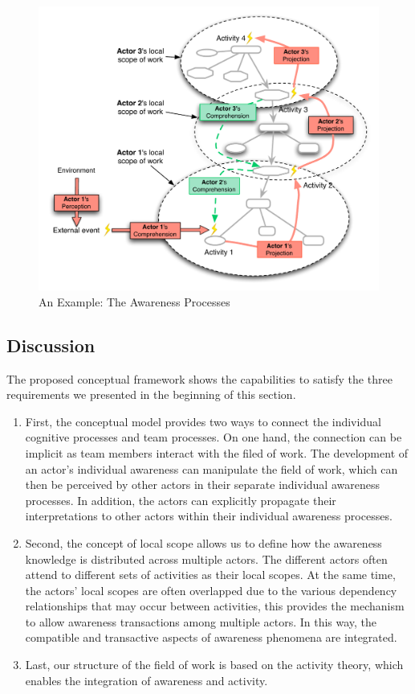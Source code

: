 \begin{figure}[htbp] %
   \centering
   \includegraphics[width=4.5in]{awareness_process.pdf} 
   \caption{An Example: The Awareness Processes}
   \label{fig:awareness_process}
\end{figure}
\subsection{Discussion} %
\label{sub:discussion}
The proposed conceptual framework shows the capabilities to satisfy the three requirements we presented in the beginning of this section.
\begin{enumerate}
	\item First, the conceptual model provides two ways to connect the individual cognitive processes and team processes. On one hand, the connection can be implicit as team members interact with the filed of work. The development of an actor's individual awareness can manipulate the field of work, which can then be perceived by other actors in their separate individual awareness processes. In addition, the actors can explicitly propagate their interpretations to other actors within their individual awareness processes.
	\item Second, the concept of local scope allows us to define how the awareness knowledge is distributed across multiple actors. The different actors often attend to different sets of activities as their local scopes. At the same time, the actors' local scopes are often overlapped due to the various dependency relationships that may occur between activities, this provides the mechanism to allow awareness transactions among multiple actors. In this way, the compatible and transactive aspects of awareness phenomena are integrated.
	\item Last, our structure of the field of work is based on the activity theory, which enables the integration of awareness and activity.  
\end{enumerate}

